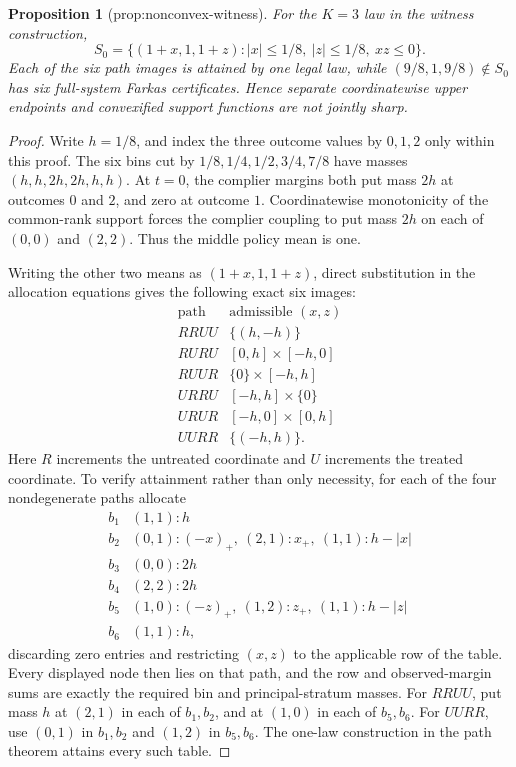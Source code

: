 \documentclass{article}
\newtheorem{proposition}{Proposition}
\begin{document}
\begin{proposition}[prop:nonconvex-witness]\label{prop:nonconvex-witness}
For the \(K=3\) law in the witness construction, \[S_0=\{(1+x,1,1+z):|x|\le1/8,\ |z|\le1/8,\ xz\le0\}.\] Each of the six path images is attained by one legal law, while \((9/8,1,9/8)\notin S_0\) has six full-system Farkas certificates. Hence separate coordinatewise upper endpoints and convexified support functions are not jointly sharp.
\end{proposition}
\begin{proof}
Write \(h=1/8\), and index the three outcome values by \(0,1,2\) only within this proof.  The six bins cut by \(1/8,1/4,1/2,3/4,7/8\) have masses \((h,h,2h,2h,h,h)\).  At \(t=0\), the complier margins both put mass \(2h\) at outcomes \(0\) and \(2\), and zero at outcome \(1\).  Coordinatewise monotonicity of the common-rank support forces the complier coupling to put mass \(2h\) on each of \((0,0)\) and \((2,2)\).  Thus the middle policy mean is one.

Writing the other two means as \((1+x,1,1+z)\), direct substitution in the allocation equations gives the following exact six images:
\[
\begin{array}{c|c}
\text{path}&\text{admissible }(x,z)\\ \hline
RRUU&\{(h,-h)\}\\
RURU&[0,h]\times[-h,0]\\
RUUR&\{0\}\times[-h,h]\\
URRU&[-h,h]\times\{0\}\\
URUR&[-h,0]\times[0,h]\\
UURR&\{(-h,h)\}.
\end{array}
\]
Here \(R\) increments the untreated coordinate and \(U\) increments the treated coordinate.  To verify attainment rather than only necessity, for each of the four nondegenerate paths allocate
\[
\begin{array}{c|l}
b_1&(1,1):h\\
b_2&(0,1):(-x)_+,\ (2,1):x_+,\ (1,1):h-|x|\\
b_3&(0,0):2h\\
b_4&(2,2):2h\\
b_5&(1,0):(-z)_+,\ (1,2):z_+,\ (1,1):h-|z|\\
b_6&(1,1):h,
\end{array}
\]
discarding zero entries and restricting \((x,z)\) to the applicable row of the table.  Every displayed node then lies on that path, and the row and observed-margin sums are exactly the required bin and principal-stratum masses.  For \(RRUU\), put mass \(h\) at \((2,1)\) in each of \(b_1,b_2\), and at \((1,0)\) in each of \(b_5,b_6\).  For \(UURR\), use \((0,1)\) in \(b_1,b_2\) and \((1,2)\) in \(b_5,b_6\).  The one-law construction in the path theorem attains every such table.


\end{proof}
\end{document}
